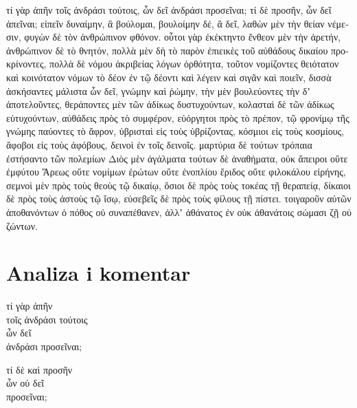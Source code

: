 {\large

\begin{greek}

\noindent τί γὰρ ἀπῆν τοῖς ἀνδράσι τούτοις, ὧν δεῖ ἀνδράσι προσεῖναι; τί δὲ προσῆν, ὧν δεῖ ἀπεῖναι; εἰπεῖν δυναίμην, ἃ βούλομαι, βουλοίμην δέ, ἃ δεῖ, λαθὼν μὲν τὴν θείαν νέμεσιν, φυγὼν δὲ τὸν ἀνθρώπινον φθόνον. οὗτοι γὰρ ἐκέκτηντο ἔνθεον μὲν τὴν ἀρετήν, ἀνθρώπινον δὲ τὸ θνητόν, πολλὰ μὲν δὴ τὸ παρὸν ἐπιεικὲς τοῦ αὐθάδους δικαίου προκρίνοντες, πολλὰ δὲ νόμου ἀκριβείας λόγων ὀρθότητα, τοῦτον νομίζοντες θειότατον καὶ κοινότατον νόμων τὸ δέον ἐν τῷ δέοντι καὶ λέγειν καὶ σιγᾶν καὶ ποιεῖν, δισσὰ ἀσκήσαντες μάλιστα ὧν δεῖ, γνώμην καὶ ῥώμην, τὴν μὲν βουλεύοντες τὴν δʼ ἀποτελοῦντες, θεράποντες μὲν τῶν ἀδίκως δυστυχούντων, κολασταὶ δὲ τῶν ἀδίκως εὐτυχούντων, αὐθάδεις πρὸς τὸ συμφέρον, εὐόργητοι πρὸς τὸ πρέπον, τῷ φρονίμῳ τῆς γνώμης παύοντες τὸ ἄφρον, ὑβρισταὶ εἰς τοὺς ὑβρίζοντας, κόσμιοι εἰς τοὺς κοσμίους, ἄφοβοι εἰς τοὺς ἀφόβους, δεινοὶ ἐν τοῖς δεινοῖς. μαρτύρια δὲ τούτων τρόπαια ἐστήσαντο τῶν πολεμίων Διὸς μὲν ἀγάλματα τούτων δὲ ἀναθήματα, οὐκ ἄπειροι οὔτε ἐμφύτου Ἄρεως οὔτε νομίμων ἐρώτων οὔτε ἐνοπλίου ἔριδος οὔτε φιλοκάλου εἰρήνης, σεμνοὶ μὲν πρὸς τοὺς θεοὺς τῷ δικαίῳ, ὅσιοι δὲ πρὸς τοὺς τοκέας τῇ θεραπείᾳ, δίκαιοι δὲ πρὸς τοὺς ἀστοὺς τῷ ἴσῳ, εὐσεβεῖς δὲ πρὸς τοὺς φίλους τῇ πίστει. τοιγαροῦν αὐτῶν ἀποθανόντων ὁ πόθος οὐ συναπέθανεν, ἀλλʼ ἀθάνατος ἐν οὐκ ἀθανάτοις σώμασι ζῇ οὐ ζώντων.

\end{greek}

}


\section*{Analiza i komentar}


{\large
\begin{greek}
\noindent τί γὰρ ἀπῆν \\
τοῖς ἀνδράσι τούτοις \\
\tabto{2em} ὧν δεῖ \\
\tabto{4em} ἀνδράσι προσεῖναι;

\noindent τί δὲ καὶ προσῆν \\
\tabto{2em} ὧν οὐ δεῖ \\
\tabto{4em} προσεῖναι;\\
\end{greek}
}

